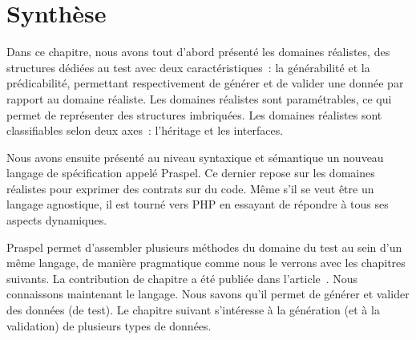 \section{Synthèse}
\label{section:language:summary}

Dans ce chapitre, nous avons tout d'abord présenté les domaines réalistes, des
structures dédiées au test avec deux caractéristiques~: la générabilité et la
prédicabilité, permettant respectivement de générer et de valider une donnée par
rapport au domaine réaliste. Les domaines réalistes sont paramétrables, ce qui
permet de représenter des structures imbriquées. Les domaines réalistes sont
classifiables selon deux axes~: l'héritage et les interfaces.

Nous avons ensuite présenté au niveau syntaxique et sémantique un nouveau
langage de spécification appelé Praspel. Ce dernier repose sur les domaines
réalistes pour exprimer des contrats sur du code. Même s'il se veut être un
langage agnostique, il est tourné vers PHP en essayant de répondre à tous ses
aspects dynamiques.

Praspel permet d'assembler plusieurs méthodes du domaine du test au sein d'un
même langage, de manière pragmatique comme nous le verrons avec les chapitres
suivants. La contribution de chapitre a été publiée dans
l'article~. Nous connaissons maintenant le langage. Nous
savons qu'il permet de générer et valider des données (de test). Le chapitre
suivant s'intéresse à la génération (et à la validation) de plusieurs types de
données.
